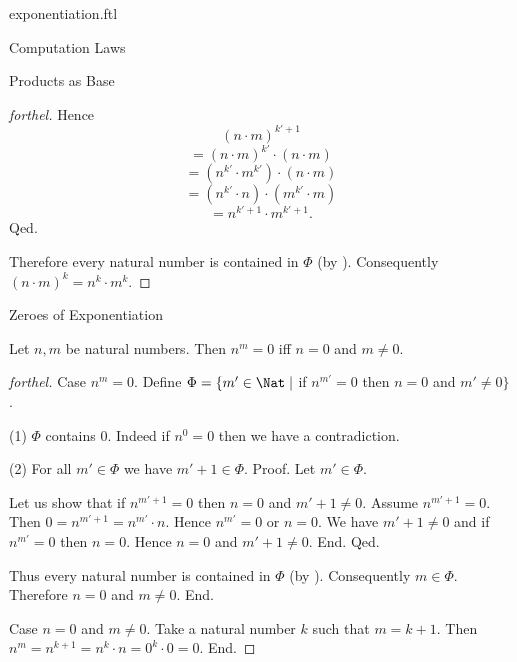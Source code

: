 \documentclass{naproche-library}
\begin{document}
\begin{smodule}[title=Exponentiation]{exponentiation.ftl}
\begin{sfragment}{Computation Laws}
\begin{sfragment}{Products as Base}
\begin{proof}[forthel]
        Hence
        \[  (n \cdot m)^{k' + 1}                          \]
        \[    = (n \cdot m)^{k'} \cdot (n \cdot m)        \]
        \[    = (n^{k'} \cdot m^{k'}) \cdot (n \cdot m)   \]
        \[    = (n^{k'} \cdot n) \cdot (m^{k'} \cdot m)   \]
        \[    = n^{k' + 1} \cdot m^{k' + 1}.              \]
      Qed.

      Therefore every natural number is contained in $\Phi$ (by ).
      Consequently $(n \cdot m)^{k} = n^{k} \cdot m^{k}$.
    \end{proof}
  \end{sfragment}

  \begin{sfragment}{Zeroes of Exponentiation}
    \begin{proposition}[forthel,id=ARITHMETIC_09_3860221447372800]
      Let $n, m$ be natural numbers.
      Then $n^{m} = 0$ iff $n = 0$ and $m \neq 0$.
    \end{proposition}
    \begin{proof}[forthel]
      Case $n^{m} = 0$.
        Define $\Phi = \{ m' \in \Nat \mid$ if $n^{m'} = 0$ then $n = 0$ and $m' \neq 0 \}$.

        (1) $\Phi$ contains $0$.
        Indeed if $n^{0} = 0$ then we have a contradiction.

        (2) For all $m' \in \Phi$ we have $m' + 1 \in \Phi$. \newline
        Proof.
          Let $m' \in \Phi$.

          Let us show that if $n^{m' + 1} = 0$ then $n = 0$ and $m' + 1 \neq 0$.
            Assume $n^{m' + 1} = 0$.
            Then $0 = n^{m' + 1} = n^{m'} \cdot n$.
            Hence $n^{m'} = 0$ or $n = 0$.
            We have $m' + 1 \neq 0$ and if $n^{m'} = 0$ then $n = 0$.
            Hence $n = 0$ and $m' + 1 \neq 0$.
          End.
        Qed.

        Thus every natural number is contained in $\Phi$ (by ).
        Consequently $m \in \Phi$.
        Therefore $n = 0$ and $m \neq 0$.
      End.

      Case $n = 0$ and $m \neq 0$.
        Take a natural number $k$ such that $m = k + 1$.
        Then $n^{m}
          = n^{k + 1}
          = n^{k} \cdot n
          = 0^{k} \cdot 0
          = 0$.
      End.
    \end{proof}
  \end{sfragment}
\end{sfragment}
\end{smodule}
\end{document}
